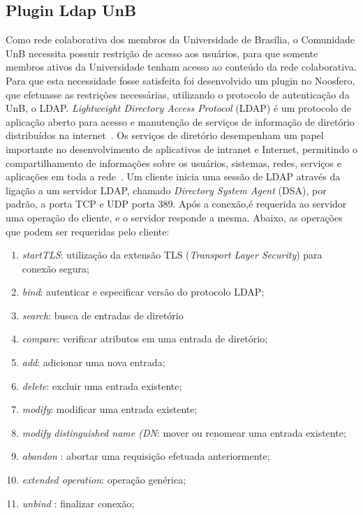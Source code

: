 \subsection{Plugin Ldap UnB}
%
Como rede colaborativa dos membros da Universidade de Brasília, o Comunidade UnB 
necessita possuir restrição de acesso aos usuários, para que somente membros ativos 
da Universidade tenham acesso ao conteúdo da rede colaborativa. 
%
Para que esta necessidade fosse satisfeita foi desenvolvido um plugin no Noosfero, 
que efetuasse as restrições necessárias, utilizando o protocolo de autenticação da 
UnB, o LDAP.
%
\textit{Lightweight Directory Access Protocol} (LDAP) é um protocolo de aplicação 
aberto para acesso e manutenção  de serviços de informação de diretório distribuídos 
na internet~\cite{sermersheim2006}.
%
Os serviços de diretório desempenham um papel importante no desenvolvimento de aplicativos 
de intranet e Internet, permitindo o compartilhamento de informações sobre os usuários, 
sistemas, redes, serviços e aplicações em toda a rede~\cite{oracle2000}.
%
Um cliente inicia uma sessão de LDAP através da ligação a um servidor LDAP, chamado 
\textit{Directory System Agent} (DSA), por padrão, a porta TCP e UDP porta 389. Após 
a conexão,é requerida ao servidor uma operação do cliente, e o servidor responde a 
mesma. 
%
Abaixo, as operações que podem ser requeridas pelo cliente:
%
\begin{enumerate}
\item \textit{startTLS}: utilização da extensão TLS (\textit{Transport Layer Security}) 
para conexão segura;
\item \textit{bind}: autenticar e especificar versão do protocolo LDAP;
\item \textit{search}: busca de entradas de diretório
\item \textit{compare}: verificar atributos em uma entrada de diretório;
\item \textit{add}: adicionar uma nova entrada;
\item \textit{delete}: excluir uma entrada existente;
\item \textit{modify}: modificar  uma entrada existente;
\item \textit{modify distinguished name (DN}: mover ou renomear uma entrada existente;
\item \textit{abandon} : abortar uma requisição efetuada anteriormente;
\item \textit{extended operation}: operação genérica;
\item \textit{unbind} : finalizar conexão;
\end{enumerate}
